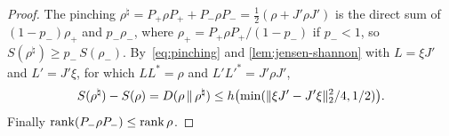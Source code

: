 \begin{proof}
The pinching $\rho^\natural=P_+\rho P_++P_-\rho P_-=\frac12(\rho+J'\rho J')$ is the direct sum of $(1-p_-)\rho_+$ and $p_-\rho_-$, where
$\rho_+=P_+\rho P_+/(1-p_-)$ if $p_-<1$, so $S(\rho^\natural)\ge p_-\,S(\rho_-)$. By~\eqref{eq:pinching} and \cref{lem:jensen-shannon} with
$L=\xi J'$ and $L'=J'\xi$, for which $LL^*=\rho$ and $L'L'^*=J'\rho J'$,
\[
S(\rho^\natural)-S(\rho)=D(\rho\,\|\,\rho^\natural)\le h\bigl(\min(\lVert \xi J'-J'\xi\rVert_2^2/4,1/2)\bigr).
\]
Finally $\operatorname{rank}(P_-\rho P_-)\le\operatorname{rank}\rho$.
\end{proof}
